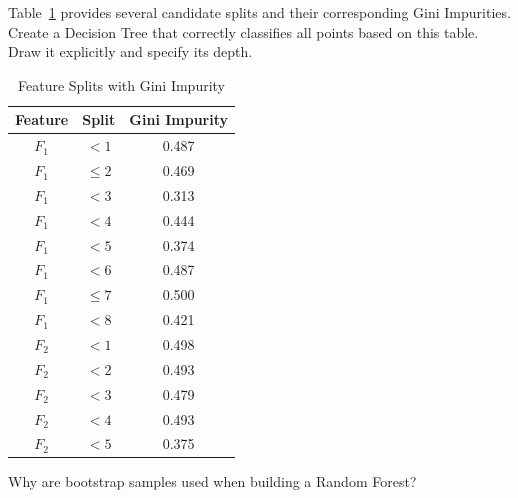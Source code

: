 \documentclass[12pt]{article}
\begin{document}
    \begin{ejercicio}
        Table~\ref{tab:feature_splits} provides several candidate splits and their corresponding Gini Impurities. Create a Decision Tree that correctly classifies all points based on this table. Draw it explicitly and specify its depth.

        \begin{table}[h!]
        \centering
        \begin{tabular}{|c|c|c|}
        \hline
        \textbf{Feature} & \textbf{Split} & \textbf{Gini Impurity} \\ \hline
        $F_1$ & $<1$ & 0.487 \\ \hline
        $F_1$ & $\le 2$ & 0.469 \\ \hline
        $F_1$ & $<3$ & 0.313 \\ \hline
        $F_1$ & $<4$ & 0.444 \\ \hline
        $F_1$ & $<5$ & 0.374 \\ \hline
        $F_1$ & $<6$ & 0.487 \\ \hline
        $F_1$ & $\le 7$ & 0.500 \\ \hline
        $F_1$ & $<8$ & 0.421 \\ \hline
        $F_2$ & $<1$ & 0.498 \\ \hline
        $F_2$ & $<2$ & 0.493 \\ \hline
        $F_2$ & $<3$ & 0.479 \\ \hline
        $F_2$ & $<4$ & 0.493 \\ \hline
        $F_2$ & $<5$ & 0.375 \\ \hline
        \end{tabular}
        \caption{Feature Splits with Gini Impurity}
        \label{tab:feature_splits}
        \end{table}
    \end{ejercicio}

    \begin{ejercicio}
        Why are bootstrap samples used when building a Random Forest?
    \end{ejercicio}
\end{document}
